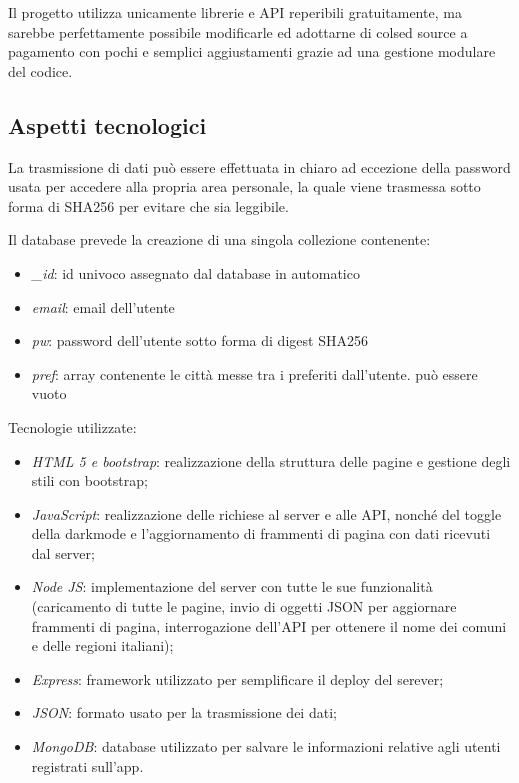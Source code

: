 \vspace{5mm}

Il progetto utilizza unicamente librerie e API reperibili gratuitamente, ma sarebbe perfettamente possibile modificarle ed 
adottarne di colsed source a pagamento con pochi e semplici aggiustamenti grazie ad una gestione modulare del codice.


\subsection{Aspetti tecnologici}

La trasmissione di dati può essere effettuata in chiaro ad eccezione della password usata per accedere alla propria area 
personale, la quale viene trasmessa sotto forma di SHA256 per evitare che sia leggibile.

\vspace{5mm}

Il database prevede la creazione di una singola collezione contenente:
\begin{itemize}
    \item \emph{\_id}: id univoco assegnato dal database in automatico
    \item \emph{email}: email dell'utente 
    \item \emph{pw}: password dell'utente sotto forma di digest SHA256
    \item \emph{pref}: array contenente le città messe tra i preferiti dall'utente. può essere vuoto
\end{itemize}

\vspace{5mm}

Tecnologie utilizzate:
\begin{itemize}
    \item \emph{HTML 5 e bootstrap}: realizzazione della struttura delle pagine e gestione degli stili con bootstrap;
    \item \emph{JavaScript}: realizzazione delle richiese al server e alle API, nonché del toggle della darkmode e l'aggiornamento 
    di frammenti di pagina con dati ricevuti dal server; 
    \item \emph{Node JS}: implementazione del server con tutte le sue funzionalità (caricamento di tutte le pagine, 
    invio di oggetti JSON per aggiornare frammenti di pagina, interrogazione dell'API per ottenere il nome dei comuni e delle 
    regioni italiani);
    \item \emph{Express}: framework utilizzato per semplificare il deploy del serever;
    \item \emph{JSON}: formato usato per la trasmissione dei dati;
    \item \emph{MongoDB}: database utilizzato per salvare le informazioni relative agli utenti registrati sull'app.
\end{itemize}

